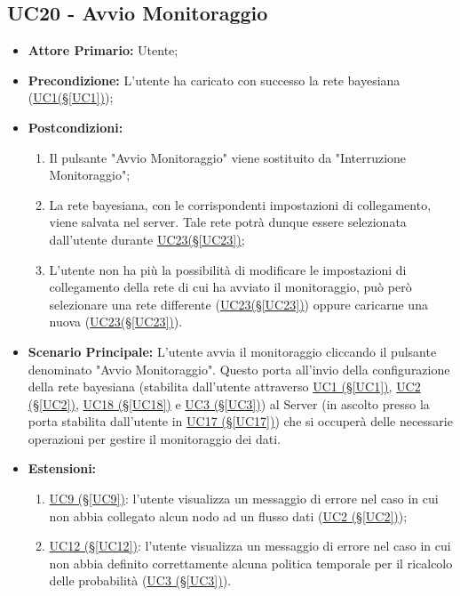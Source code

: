 \pagebreak

\subsection{UC20 - Avvio Monitoraggio}\label{UC20}

\begin{itemize}
	\item \textbf{Attore Primario:} Utente;
	\item \textbf{Precondizione:} L'utente ha caricato con successo la rete bayesiana (\hyperref[UC1]{UC1(§\ref*{UC1})});
	\item \textbf{Postcondizioni:}
	\begin{enumerate}
		\item Il pulsante "Avvio Monitoraggio" viene sostituito da "Interruzione Monitoraggio";
		\item La rete bayesiana, con le corrispondenti impostazioni di collegamento, viene salvata nel server. Tale rete potrà dunque essere selezionata dall'utente durante \hyperref[UC23]{UC23(§\ref*{UC23})};
		\item L'utente non ha più la possibilità di modificare le impostazioni di collegamento della rete di cui ha avviato il monitoraggio, può però selezionare una rete differente (\hyperref[UC23]{UC23(§\ref*{UC23})}) oppure caricarne una nuova (\hyperref[UC23]{UC23(§\ref*{UC23})}).
	\end{enumerate}
	\item \textbf{Scenario Principale:} L'utente avvia il monitoraggio cliccando il pulsante denominato "Avvio Monitoraggio". Questo porta all'invio della configurazione della rete bayesiana (stabilita dall'utente attraverso \hyperref[UC1]{UC1 (§\ref*{UC1})}, \hyperref[UC2]{UC2 (§\ref*{UC2})}, \hyperref[UC18]{UC18 (§\ref*{UC18})} e \hyperref[UC3]{UC3 (§\ref*{UC3})}) al Server (in ascolto presso la porta stabilita dall'utente in \hyperref[UC17]{UC17 (§\ref*{UC17})}) che si occuperà delle necessarie operazioni per gestire il monitoraggio dei dati.
	\item \textbf{Estensioni:}
	\begin{enumerate}
		\item \hyperref[UC9]{UC9 (§\ref*{UC9})}: l'utente visualizza un messaggio di errore nel caso in cui non abbia collegato alcun nodo ad un flusso dati (\hyperref[UC2]{UC2 (§\ref*{UC2})});
		\item \hyperref[UC12]{UC12 (§\ref*{UC12})}: l'utente visualizza un messaggio di errore nel caso in cui non abbia definito correttamente alcuna politica temporale per il ricalcolo delle probabilità (\hyperref[UC3]{UC3 (§\ref*{UC3})}).
	\end{enumerate}
\end{itemize}

